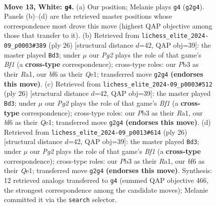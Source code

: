 \documentclass[11pt]{article}
\begin{document}
\clearpage

\begin{figure}[p]\centering
\begin{subfigure}{0.46\textwidth}\centering
\resizebox{\linewidth}{!}{%
\newchessgame
\chessboard[
  setfen={r1b1q1k1/p1pp1ppp/3n1b2/1p6/3P4/1P6/P1P2PPP/RNBQ1BK1 w - - 0 13},
  showmover=false,
  pgfstyle=straightmove, color=movearrow, markmove={g2-g4}
]}
\caption{}
\end{subfigure}\hfill
\begin{subfigure}{0.46\textwidth}\centering
\resizebox{\linewidth}{!}{%
\newchessgame
\chessboard[
  setfen={r1bqn1k1/ppp2ppp/5b2/3p4/3P1B2/2P5/PP3PPP/RN2QBK1 w - - 0 14},
  showmover=false,
  pgfstyle=straightmove, color=movearrow, markmove={f1-d3}
]}
\caption{}
\end{subfigure}
\\[4pt]
\begin{subfigure}{0.46\textwidth}\centering
\resizebox{\linewidth}{!}{%
\newchessgame
\chessboard[
  setfen={r1bqn1k1/ppp2ppp/5b2/3p4/3P1B2/2P5/PP3PPP/RN2QBK1 w - - 0 14},
  showmover=false,
  pgfstyle=straightmove, color=movearrow, markmove={f1-d3}
]}
\caption{}
\end{subfigure}\hfill
\begin{subfigure}{0.46\textwidth}\centering
\resizebox{\linewidth}{!}{%
\newchessgame
\chessboard[
  setfen={r1bqn1k1/ppp2ppp/5b2/3p4/3P1B2/2P5/PP3PPP/RN2QBK1 w - - 0 14},
  showmover=false,
  pgfstyle=straightmove, color=movearrow, markmove={f1-d3}
]}
\caption{}
\end{subfigure}
\caption{\textbf{Move 13, White: \texttt{g4}.} (a) Our position; Melanie plays \texttt{g4} (\texttt{g2g4}). Panels (b)--(d) are the retrieved master positions whose correspondence most drove this move (highest QAP objective among those that transfer to it). (b) Retrieved from \texttt{lichess\_elite\_2024-09\_p0003\#389} (ply 26) [structural distance $d$=42, QAP obj=39]: the master played \texttt{Bd3}; under $\mu$ our \emph{Pg2} plays the role of that game's \emph{Bf1} (a \textbf{cross-type} correspondence); cross-type roles: our \emph{P}b3 as their \emph{R}a1, our \emph{b}f6 as their \emph{Q}e1; transferred move \texttt{g2g4} \textbf{(endorses this move)}. (c) Retrieved from \texttt{lichess\_elite\_2024-09\_p0003\#512} (ply 26) [structural distance $d$=42, QAP obj=39]: the master played \texttt{Bd3}; under $\mu$ our \emph{Pg2} plays the role of that game's \emph{Bf1} (a \textbf{cross-type} correspondence); cross-type roles: our \emph{P}b3 as their \emph{R}a1, our \emph{b}f6 as their \emph{Q}e1; transferred move \texttt{g2g4} \textbf{(endorses this move)}. (d) Retrieved from \texttt{lichess\_elite\_2024-09\_p0013\#614} (ply 26) [structural distance $d$=42, QAP obj=39]: the master played \texttt{Bd3}; under $\mu$ our \emph{Pg2} plays the role of that game's \emph{Bf1} (a \textbf{cross-type} correspondence); cross-type roles: our \emph{P}b3 as their \emph{R}a1, our \emph{b}f6 as their \emph{Q}e1; transferred move \texttt{g2g4} \textbf{(endorses this move)}. Synthesis: 12 retrieved analogs transferred to \texttt{g4} (summed QAP objective 466, the strongest correspondence among the candidate moves); Melanie committed it via the \texttt{search} selector.}

\end{figure}
\end{document}

